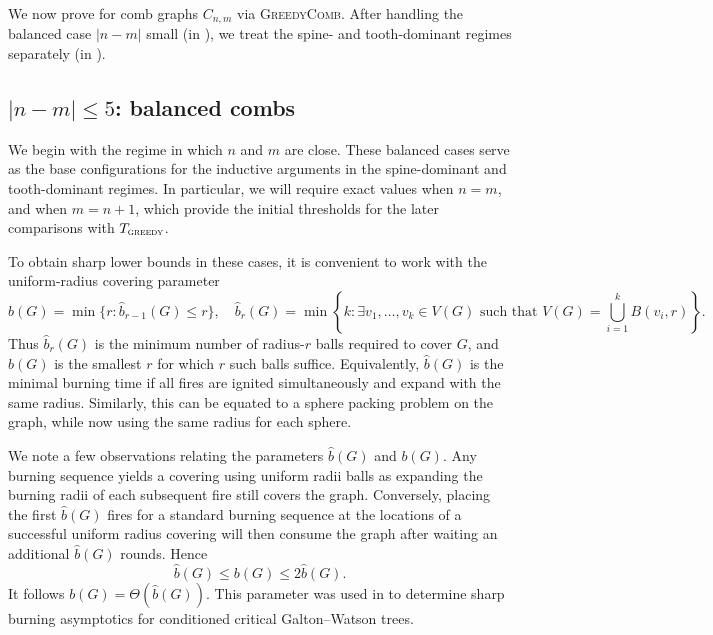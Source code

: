 \documentclass{article}
\newcommand{\gr}{\textsc{greedy}}
\begin{document}
We now prove  for comb graphs $C_{n,m}$ via \textsc{GreedyComb}. After handling the balanced case $|n-m|$ small (in ), we treat the spine- and tooth-dominant regimes separately (in ).


\subsection{\texorpdfstring{\boldmath$|n - m| \le 5$}{n ~ m}: balanced combs}
\label{sec: balanced}

We begin with the regime in which $n$ and $m$ are close. These balanced cases serve as the base configurations for the inductive arguments in the spine-dominant and tooth-dominant regimes. In particular, we will require exact values when $n=m$, and when $m=n+1$, which provide the initial thresholds for the later comparisons with $T_\gr$.

To obtain sharp lower bounds in these cases, it is convenient to work with the uniform-radius covering parameter
\begin{equation*}%
    \hat b(G) = \min\{r : \hat b_{r-1}(G) \le r\}, 
    \quad 
    \hat b_r(G) = \min \left\{ k : \exists v_1,\ldots,v_k \in V(G) \mbox{ such that }
    V(G) = \bigcup_{i=1}^k B(v_i,r) \right\}.
\end{equation*}
Thus $\hat b_r(G)$ is the minimum number of radius-$r$ balls required to cover $G$, and $\hat b(G)$ is the smallest $r$ for which $r$ such balls suffice. Equivalently, $\hat b(G)$ is the minimal burning time if all fires are ignited simultaneously and expand with the same radius. Similarly, this can be equated to a sphere packing problem on the graph, while now using the same radius for each sphere.

We note a few observations relating the parameters $\hat b(G)$ and $b(G)$. Any burning sequence yields a covering using uniform radii balls as expanding the burning radii of each subsequent fire still covers the graph. Conversely, placing the first $\hat b(G)$ fires for a standard burning sequence at the locations of a successful uniform radius covering will then consume the graph after waiting an additional $\hat b(G)$ rounds. Hence
\begin{equation*}
    \hat b(G) \le b(G) \le 2\hat b(G).
\end{equation*}
It follows $b(G) = \Theta(\hat b(G))$. This parameter was used in \cite{devroye2025burning} to determine sharp burning asymptotics for conditioned critical Galton--Watson trees.
\end{document}
